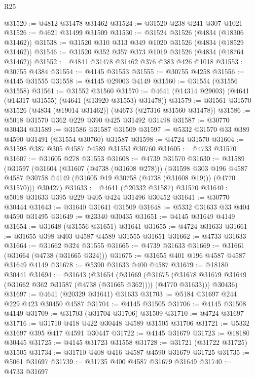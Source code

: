 \begin{lexlean}{R25}
\begin{coremodule}
@31520 := @4812 @31478 @31462
@31524 := @31520 @238 @241 @307 @1021
@31526 := @4621 @31499 @31509
@31530 := @31524 @31526 (@4834 (@18306 @31462))
@31538 := @31520 @310 @313 @349 @1020 @31526 (@4834 (@18529 @31462))
@31546 := @31520 @352 @357 @373 @1019 @31526 (@4834 (@18764 @31462))
@31552 := @4841 @31478 @31462 @376 @383 @426 @1018
@31553 := @30755 @4384
@31554 := @4145 @31553
@31555 := @30755 @4258
@31556 := @4145 @31555
@31558 := @4145 @29003 @4149
@31560 := @31554 (@31556 @31558)
@31561 := @31552 @31560
@31570 := @4641 (@14314 @29003) (@4641 (@14317 @31555) (@4641 (@13920 @31553) @31478))
@31579 := @31561 @31570 @31526 (@4834 (@19014 @31462)) (@4673 (@27316 @31560 @31478))
@31586 := @5018 @31570 @362 @229 @390 @425 @31492 @31498
@31587 := @30770 @30434
@31589 := @31586 @31587 @31509
@31597 := @5332 @31570 @33 @389 @4590 @31491 (@31554 @30760) @31587
@31598 := @4724 @31570
@31604 := @31598 @387 @305 @4587 @4589 @31553 @30760
@31605 := @4733 @31570
@31607 := @31605 @278 @31553
@31608 := @4739 @31570
@31630 := @31589
    (@31597
      (@31604
        (@31607 (@4738 (@31608 @278)))
        (@31598
          @303
          @196
          @4587
          @4587
          @30758
          @4149
          (@31605 @19 @30758 (@4738 (@31608 @19)))
          (@4770 @31570)))
      @30427)
@31633 := @4641 (@20332 @31587) @31570
@31640 := @5018 @31633 @395 @229 @405 @424 @31496 @30452
@31641 := @30770 @30444
@31643 := @31640 @31641 @31509
@31648 := @5332 @31633 @33 @404 @4590 @31495
@31649 := @23340 @30435
@31651 := @4145 @31649 @4149
@31654 := @31648 (@31556 @31651) @31641
@31655 := @4724 @31633
@31661 := @31655 @398 @403 @4587 @4589 @31555 @31651
@31662 := @4733 @31633
@31664 := @31662 @324 @31555
@31665 := @4739 @31633
@31669 := @31661 (@31664 (@4738 (@31665 @324)))
@31675 := @31655 @401 @196 @4587 @4587 @31649 @4149
@31678 := @5390 @31633 @400 @4587
@31679 := @18180 @30441
@31694 := @31643
    (@31654
      (@31669
        (@31675 (@31678 @31679 @31649 (@31662 @362 @31587 (@4738 (@31665 @362)))) (@4770 @31633)))
      @30436)
@31697 := @4641 (@20329 @31641) @31633
@31703 := @5184 @31697 @244 @229 @423 @30450 @4587
@31704 := @4145 @31505
@31706 := @4145 @31508 @4149
@31709 := @31703 (@31704 @31706) @31509
@31710 := @4724 @31697
@31716 := @31710 @418 @422 @30448 @4589 @31505 @31706
@31721 := @5332 @31697 @395 @417 @4591 @30447
@31722 := @4145 @31679
@31723 := @18180 @30445
@31725 := @4145 @31723 @31558
@31728 := @31721 (@31722 @31725) @31505
@31734 := @31710 @408 @416 @4587 @4590 @31679 @31725
@31735 := @5061 @31697
@31739 := @31735 @400 @4587 @31679 @31649
@31740 := @4733 @31697

\end{coremodule}
\end{lexlean}

